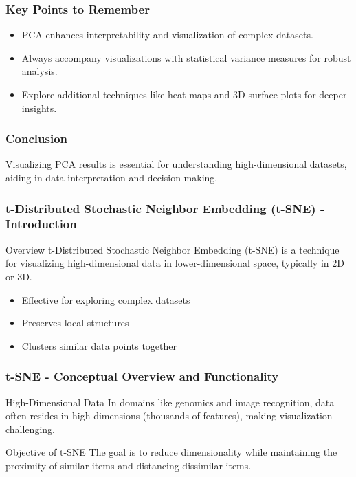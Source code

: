 \documentclass[aspectratio=169]{beamer}
\begin{document}
\begin{frame}[fragile]
    \frametitle{Key Points to Remember}
    \begin{itemize}
        \item PCA enhances interpretability and visualization of complex datasets.
        \item Always accompany visualizations with statistical variance measures for robust analysis.
        \item Explore additional techniques like heat maps and 3D surface plots for deeper insights.
    \end{itemize}
\end{frame}

\begin{frame}[fragile]
    \frametitle{Conclusion}
    Visualizing PCA results is essential for understanding high-dimensional datasets, aiding in data interpretation and decision-making.
\end{frame}

\begin{frame}[fragile]
    \frametitle{t-Distributed Stochastic Neighbor Embedding (t-SNE) - Introduction}
    \begin{block}{Overview}
        t-Distributed Stochastic Neighbor Embedding (t-SNE) is a technique for visualizing high-dimensional data in lower-dimensional space, typically in 2D or 3D. 
    \end{block}
    \begin{itemize}
        \item Effective for exploring complex datasets
        \item Preserves local structures
        \item Clusters similar data points together
    \end{itemize}
\end{frame}

\begin{frame}[fragile]
    \frametitle{t-SNE - Conceptual Overview and Functionality}
    \begin{block}{High-Dimensional Data}
        In domains like genomics and image recognition, data often resides in high dimensions (thousands of features), making visualization challenging.
    \end{block}
    \begin{block}{Objective of t-SNE}
        The goal is to reduce dimensionality while maintaining the proximity of similar items and distancing dissimilar items.
    \end{block}
\end{frame}
\end{document}
